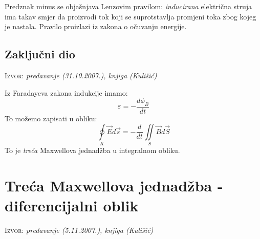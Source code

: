 \documentclass{report}
\begin{document}
Predznak minus se objašnjava Lenzovim pravilom: \textit{inducirana} električna 
struja ima takav smjer da proizvodi tok koji se suprotstavlja promjeni toka zbog 
kojeg je nastala. Pravilo proizlazi iz zakona o očuvanju energije.

\subsection{Zaključni dio}
\small \textsc{Izvor:} \textit{predavanje (31.10.2007.), knjiga (Kulišić)}

Iz Faradayeva zakona indukcije imamo:
$$\varepsilon = - \frac{d \phi _B}{dt}$$
To možemo zapisati u obliku:
$$\oint\limits_K {\vec E d\vec s} = - \frac{d} {{dt}}\iint\limits_S {\vec Bd\vec S}$$
To je \textit{treća} Maxwellova jednadžba u integralnom obliku.

\section{Treća Maxwellova jednadžba - diferencijalni oblik}
\small \textsc{Izvor:} \textit{predavanje (5.11.2007.), knjiga (Kulišić)}
\end{document}
